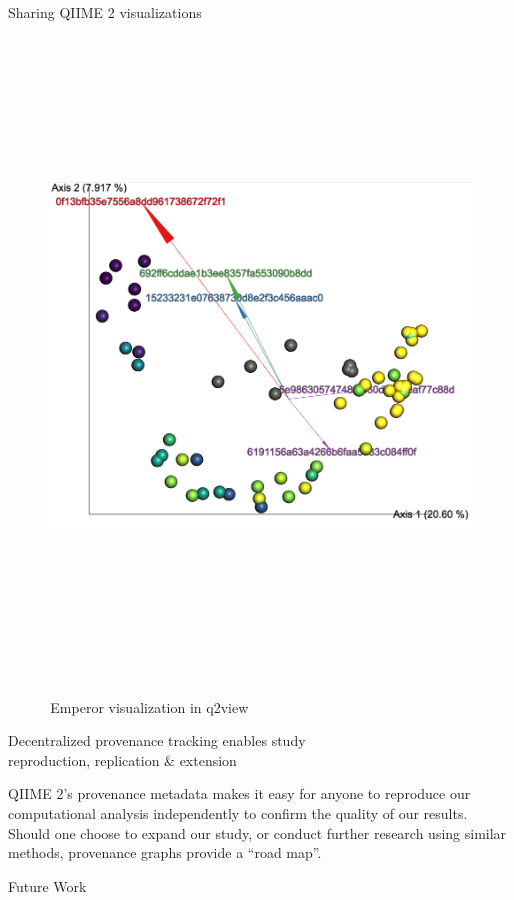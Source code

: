\documentclass[final]{beamer}
\newlength{\colwidth}
\begin{document}
\begin{frame}[t]
\begin{columns}[t]
\begin{column}{\colwidth}
\begin{block}{Sharing QIIME 2 visualizations}
    \begin{figure}[tph!]
      {\includegraphics[height=17cm]{assets/emperor}}
      \caption{\,Emperor visualization in q2view}
      \label{fig:emperor}
    \end{figure}

  \end{block}

  \begin{block}{Decentralized provenance tracking enables study \\ reproduction, replication \& extension}

    QIIME 2’s provenance metadata makes it easy for anyone to reproduce our
    computational analysis independently to confirm the quality of our results.
    Should one choose to expand our study, or conduct further research using
    similar methods, provenance graphs provide a “road map”.

  \end{block}

  \begin{block}{Future Work}


\end{block}
\end{column}
\end{columns}
\end{frame}
\end{document}
